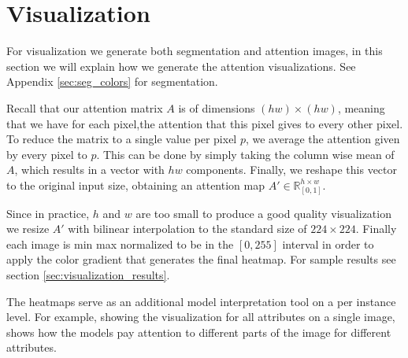 \section{Visualization}
\label{sec:methodology_visualization}
For visualization we generate both segmentation and attention images, in this section
we will explain how we generate the attention visualizations. See Appendix \ref{sec:seg_colors} for segmentation.

Recall that our attention matrix $A$ is of dimensions $(hw)\times(hw)$, meaning that we
have for each pixel,the attention that this pixel gives to every other
pixel. To reduce the matrix to a single value per pixel $p$, we average the attention
given by every pixel to $p$. This can be done by
simply taking the column wise mean of $A$, which results in a vector with $hw$ components.
Finally, we reshape this vector to the original input size,
obtaining an attention map $A' \in \mathbb{R}_{[0,1]}^{h \times w}$.

Since in practice, $h$ and $w$ are too small to produce a good quality visualization we resize $A'$ with
bilinear interpolation to the standard size of $224 \times 224$. Finally each image is min max normalized to be in
the $[0, 255]$ interval in order to apply the color gradient that generates the final heatmap.
For sample results see section \ref{sec:visualization_results}.

The heatmaps serve as an additional model interpretation
tool on a per instance level. For example, showing the visualization for all attributes on
a single image, shows how the models pay attention to different parts of the image for different
attributes.